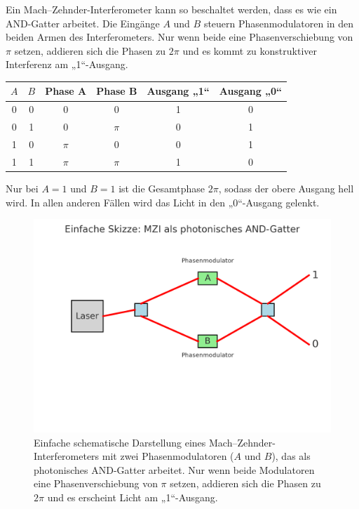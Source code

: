 \begin{tcolorbox}[didaktikbox, title=Photonisches AND-Gatter im Mach--Zehnder-Interferometer, label={box:mzi_and}]
	\small
	Ein Mach--Zehnder-Interferometer kann so beschaltet werden, dass es wie ein \textsc{AND}-Gatter arbeitet. 
	Die Eingänge \(A\) und \(B\) steuern Phasenmodulatoren in den beiden Armen des Interferometers. 
	Nur wenn beide eine Phasenverschiebung von \(\pi\) setzen, addieren sich die Phasen zu \(2\pi\) und es kommt zu konstruktiver Interferenz am „1“-Ausgang.
	
	\begin{center}
		\begin{tabular}{c c c c c c}
			\toprule
			\(A\) & \(B\) & Phase A & Phase B & Ausgang „1“ & Ausgang „0“ \\
			\midrule
			0 & 0 & \(0\) & \(0\) & 1 & 0 \\
			0 & 1 & \(0\) & \(\pi\) & 0 & 1 \\
			1 & 0 & \(\pi\) & \(0\) & 0 & 1 \\
			1 & 1 & \(\pi\) & \(\pi\) & 1 & 0 \\
			\bottomrule
		\end{tabular}
	\end{center}
	
	Nur bei \(A=1\) und \(B=1\) ist die Gesamtphase \(2\pi\), sodass der obere Ausgang hell wird. 
	In allen anderen Fällen wird das Licht in den „0“-Ausgang gelenkt.
\end{tcolorbox}
\begin{figure}[H]
	\centering
	\includegraphics[width=0.75\linewidth]{bilder/mzi_and_simple.png} %
	\caption{Einfache schematische Darstellung eines Mach--Zehnder-Interferometers mit zwei Phasenmodulatoren (\(A\) und \(B\)), das als photonisches \textsc{AND}-Gatter arbeitet. Nur wenn beide Modulatoren eine Phasenverschiebung von \(\pi\) setzen, addieren sich die Phasen zu \(2\pi\) und es erscheint Licht am „1“-Ausgang.}
	\label{fig:mzi_and_simple}
\end{figure}

